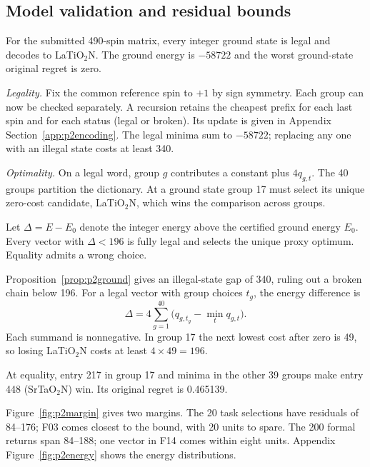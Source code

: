 \subsection{Model validation and residual bounds}\label{sec:p2cert}
\begin{proposition}\label{prop:p2ground}
For the submitted 490-spin matrix, every integer ground state is legal and decodes to LaTiO$_2$N. The ground energy is $-58722$ and the worst ground-state original regret is zero.
\end{proposition}
\begin{p1proof}
\emph{Legality.} Fix the common reference spin to $+1$ by sign symmetry. Each group can now be checked separately. A recursion retains the cheapest prefix for each last spin and for each status (legal or broken). Its update is given in Appendix Section~\ref{app:p2encoding}. The legal minima sum to $-58722$; replacing any one with an illegal state costs at least 340.

\emph{Optimality.} On a legal word, group $g$ contributes a constant plus $4q_{g,t}$. The 40 groups partition the dictionary. At a ground state group 17 must select its unique zero-cost candidate, LaTiO$_2$N, which wins the comparison across groups.
\end{p1proof}

\begin{proposition}\label{prop:p2margin}
Let $\Delta=E-E_0$ denote the integer energy above the certified ground energy $E_0$. Every vector with $\Delta<196$ is fully legal and selects the unique proxy optimum. Equality admits a wrong choice.
\end{proposition}
\begin{p1proof}
Proposition~\ref{prop:p2ground} gives an illegal-state gap of 340, ruling out a broken chain below 196. For a legal vector with group choices $t_g$, the energy difference is
\begin{equation}
 \Delta=4\sum_{g=1}^{40}\big(q_{g,t_g}-\min_t q_{g,t}\big).
 \label{eq:p2excess}
\end{equation}\nopagebreak[4]
\noindent Each summand is nonnegative. In group 17 the next lowest cost after zero is 49, so losing LaTiO$_2$N costs at least $4\times49=196$. 

At equality, entry 217 in group 17 and minima in the other 39 groups make entry 448 (SrTaO$_2$N) win. Its original regret is 0.465139.
\end{p1proof}

Figure~\ref{fig:p2margin} gives two margins. The 20 task selections have residuals of 84--176; F03 comes closest to the bound, with 20 units to spare. The 200 formal returns span 84--188; one vector in F14 comes within eight units. Appendix Figure~\ref{fig:p2energy} shows the energy distributions.

